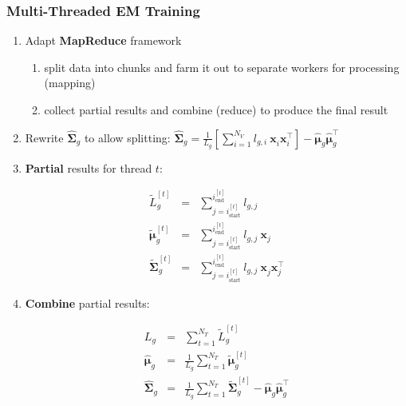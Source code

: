 \documentclass[usenames,dvipsnames]{beamer}
\def\Vec#1{{\boldsymbol{#1}}}
\def\Mat#1{{\boldsymbol{#1}}}
\begin{document}
%
%
%

\begin{frame}
\frametitle{Multi-Threaded EM Training}

\begin{enumerate}[{~~$\boldsymbol{\bullet}$}]

\item Adapt {\bf MapReduce} framework

\begin{enumerate}[{$\boldsymbol{\rightarrow}$}]
\renewcommand{\itemsep}{1ex}
\item split data into chunks and farm it out to separate workers for processing (mapping)
\item collect partial results and combine (reduce) to produce the final result
\end{enumerate}
\vspace{1ex}

\item
Rewrite $\widehat{\Mat{\Sigma}}_g$ to allow splitting:
{$\widehat{\Mat{\Sigma}}_g = \frac{1}{L_g} \left[ \sum\nolimits_{i=1}^{N_V} l_{g,i} ~ \Vec{x}_i^{~} \Vec{x}_i^\top  \right] - \widehat{\Vec{\mu}}_g^{~} \widehat{\Vec{\mu}}_g^\top$}
\vspace{1ex}

\item {\bf Partial} results for thread $t$:
%
\vspace{-2ex}
\begin{footnotesize}%
\begin{eqnarray*}
  \widetilde{L}_g^{[t]}            & = & \sum\nolimits_{j = i^{[t]}_{\textrm{start}}}^{i^{[t]}_{\textrm{end}}} l_{g,j}                             \\
  \widetilde{\Vec{\mu}}_g^{[t]}    & = & \sum\nolimits_{j = i^{[t]}_{\textrm{start}}}^{i^{[t]}_{\textrm{end}}} l_{g,j} ~ \Vec{x}_j                 \\
  \widetilde{\Mat{\Sigma}}_g^{[t]} & = & \sum\nolimits_{j = i^{[t]}_{\textrm{start}}}^{i^{[t]}_{\textrm{end}}} l_{g,j} ~ \Vec{x}_j^{~} \Vec{x}_j^\top
\end{eqnarray*}%
\end{footnotesize}

\item {\bf Combine} partial results:
%
\begin{footnotesize}%
\vspace{-2ex}
\begin{eqnarray*}
  L_g                      & = & \sum\nolimits_{t=1}^{N_T} \widetilde{L}_g^{[t]} \\
  \widehat{\Vec{\mu}}_g    & = & \frac{1}{L_g} \sum\nolimits_{t=1}^{N_T} \widetilde{\Vec{\mu}}_g^{[t]} \\
  \widehat{\Mat{\Sigma}}_g & = & \frac{1}{L_g} \sum\nolimits_{t=1}^{N_T} \widetilde{\Mat{\Sigma}}_g^{[t]} - \widehat{\Vec{\mu}}_g^{~} \widehat{\Vec{\mu}}_g^\top
\end{eqnarray*}%
\end{footnotesize}



\end{enumerate}
\end{frame}
%
%
%
\end{document}
